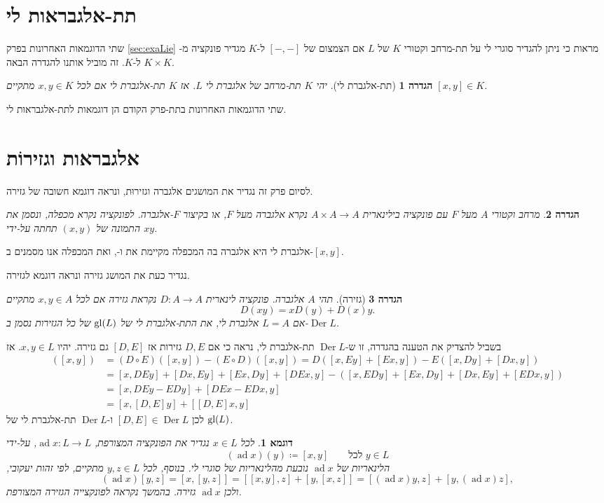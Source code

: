 \documentclass{report}
\makeatletter
\theoremstyle{break}
\newtheorem{definition}[definition]{הגדרה}
\newtheorem{example}[example]{דוגמא}
\theoremstyle{MyNonumberbreak}
\DeclareRobustCommand{\Eqref}[1]{\textup{\tagform@{\ref*{#1}}}}
\DeclareMathOperator{\Der}{Der} %
\DeclareMathOperator{\ad}{ad} %
\makeatother
\begin{document}
\section{תת-אלגבראות לי}
שתי הדוגמאות האחרונות בפרק \ref*{sec:exaLie} מראות כי ניתן להגדיר סוגרי לי על תת-מרחב וקטורי $K$ של $L$ אם הצמצום של $[-, -]$ ל-$K$ מגדיר פונקציה מ-$K \times K$ ל-$K$. זה מוביל אותנו להגדרה הבאה.
\begin{definition}[תת-אלגברת לי]
	יהי $K$ תת-מרחב של אלגברת לי $L$. אז $K$ \textit{תת-אלגברת לי} אם לכל $x, y \in K$ מתקיים $[x, y] \in K$.
\end{definition}
שתי הדוגמאות האחרונות בתת-פרק הקודם הן דוגמאות לתת-אלגבראות לי.

\section{אלגבראות וגזירוֹת}
לסיום פרק זה נגדיר את המושגים אלגברה וגזירוּת, ונראה דוגמא חשובה של גזירה.
\begin{definition} \label{def:algebra}
	מרחב וקטורי $A$ מעל $F$ עם פונקציה בילינארית $A \times A \to A$ נקרא \textit{אלגברה} מעל $F$, או בקיצור $F$-\textit{אלגברה}. לפונקציה נקרא \textit{מכפלה}, ונסמן את התמונה של $(x, y)$ תחתה על-ידי $xy$.
\end{definition}
אלגברת לי היא אלגברה בה המכפלה מקיימת את \Eqref{eq:L1} ו-\Eqref{eq:Jacobi}, ואת המכפלה אנו מסמנים ב-$[x, y]$.

נגדיר כעת את המושג גזירה ונראה דוגמא לגזירה.
\begin{definition}[גזירה]
	תהי $A$ אלגברה. פונקציה לינארית $D : A \to A$ נקראת \textit{גזירה} אם לכל $x, y \in A$ מתקיים
	\[ D(xy) = xD(y) + D(x)y. \]
	אם $L = A$ אלגברת לי, את התת-אלגברת לי של $\operatorname{gl}(L)$ של כל הגזירות נסמן ב-$\Der L$.
\end{definition}
בשביל להצדיק את הטענה בהגדרה, זו ש-$\Der L$ תת-אלגברת לי, נראה כי אם $D, E$ גזירות אז $[D, E]$ גם גזירה. יהיו $x, y \in L$. אז
\begin{align*}
	[D, E]([x, y]) &= (D \circ E)([x, y]) - (E \circ D)([x, y]) = D([x, Ey] + [Ex, y]) - E([x, Dy] + [Dx, y]) \\
		&= [x, DEy] + [Dx, Ey] + [Ex, Dy] + [DEx, y] - ([x, EDy] + [Ex, Dy] + [Dx, Ey] + [EDx, y]) \\
		&= [x, DEy - EDy] + [DEx - EDx, y] \\
		&= [x, [D, E]y] + [[D, E]x, y]
\end{align*}
לכן $[D, E] \in \Der L$ ו-$\Der L$ תת-אלגברת לי של $\operatorname{gl}(L)$. 
\begin{example}\label{exa:adjointDer}
	לכל $x \in L$ נגדיר את \textit{הפונקציה המצורפת}, $\ad x : L \to L$, על-ידי
	\[ (\ad x)(y) \coloneqq [x, y] \qquad \text{לכל $y \in L$} \]
	הלינאריות של $\ad x$ נובעת מהלינאריות של סוגרי לי. בנוסף, לכל $y, z \in L$ מתקיים, לפי זהות יעקובי,
	\[ (\ad x)[y, z] = [x, [y, z]] = [[x, y], z] + [y, [x, z]] = [(\ad x)y, z] + [y, (\ad x)z], \]
	ולכן $\ad x$ גזירה. בהמשך נקראה לפונקצייה \textit{הגזירה המצורפת}.
\end{example}
\end{document}
